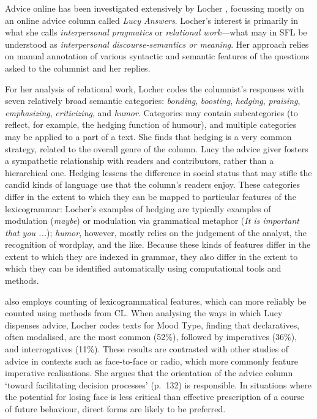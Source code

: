 Advice online has been investigated extensively by Locher \parencite*{locher2006advice,locher_health_2010}, focussing mostly on an online advice column called \emph{Lucy Answers}. Locher's interest is primarily in what she calls \emph{interpersonal pragmatics} or \emph{relational work}---what may in \gls{SFL} be understood as \emph{interpersonal \glspl{discourse-semantic} or meaning}. Her approach relies on manual annotation of various syntactic and semantic features of the questions asked to the columnist and her replies. 

For her analysis of relational work, Locher codes the columnist's responses with seven relatively broad semantic categories: \emph{bonding}, \emph{boosting}, \emph{hedging}, \emph{praising}, \emph{emphasizing}, \emph{criticizing}, and \emph{humor}. Categories may contain subcategories (to reflect, for example, the hedging function of humour), and multiple categories may be applied to a part of a text. She finds that hedging is a very common strategy, related to the overall genre of the column. Lucy the advice giver fosters a sympathetic relationship with readers and contributors, rather than a hierarchical one. Hedging lessens the difference in social status that may stifle the candid kinds of language use that the column's readers enjoy. These categories differ in the extent to which they can be mapped to particular features of the \gls{lexicogrammar}: Locher's examples of hedging are typically examples of modulation (\emph{maybe}) or modulation via grammatical metaphor (\emph{It is important that you ...}); \emph{humor}, however, mostly relies on the judgement of the analyst, the recognition of wordplay, and the like. Because these kinds of features differ in the extent to which they are indexed in grammar, they also differ in the extent to which they can be identified automatically using computational tools and methods.

\textcite{locher2006advice} also employs counting of lexicogrammatical features, which can more reliably be counted using methods from \gls{CL}. When analysing the ways in which Lucy dispenses advice, Locher codes texts for Mood Type, finding that declaratives, often modalised, are the most common (52\%), followed by imperatives (36\%), and interrogatives (11\%). These results are contrasted with other studies of advice in contexts such as face\hyp{}to\hyp{}face or radio, which more commonly feature imperative realisations. She argues that the orientation of the advice column `toward facilitating decision processes' (p.~132) is responsible. In situations where the potential for losing face is less critical than effective prescription of a course of future behaviour, direct forms are likely to be preferred.

